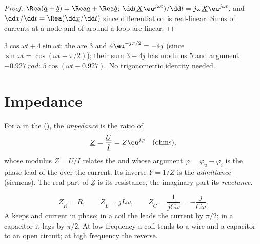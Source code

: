\begin{proof}
$\Rea(\underline a + \underline b) = \Rea\underline a + \Rea\underline b$;
$\dd(\underline X\eu^{j\omega t})/\dd t = j\omega\underline X\eu^{j\omega t}$,
and $\dd x/\dd t = \Rea(\dd\underline x/\dd t)$ since differentiation
is real-linear. Sums of currents at a node and of  around a
loop are linear.
\end{proof}

\begin{example}\label{ex:b1:sinusoidal-impedance:add}
$3\cos\omega t + 4\sin\omega t$: the  are $3$ and
$4\eu^{-j\pi/2} = -4j$ (since $\sin\omega t = \cos(\omega t - \pi/2)$);
their sum $3 - 4j$ has modulus $5$ and argument $-0.927\ \unit{rad}$:
$5\cos(\omega t - 0.927)$. No trigonometric identity needed.
\end{example}

\section{Impedance}

\begin{definition}\label{def:b1:sinusoidal-impedance:impedance}
For a  in the  (), the \emph{impedance} is the ratio of 
\[
\underline Z = \frac{\underline U}{\underline I} = Z\eu^{j\varphi}
\quad (\text{ohms}),
\]
whose modulus $Z = U/I$ relates the  and whose argument
$\varphi = \varphi_u - \varphi_i$ is the phase lead of the  over
the current. Its inverse $\underline Y = 1/\underline Z$ is the
\emph{admittance} (siemens). The real part of $\underline Z$ is its
resistance, the imaginary part its \emph{reactance}.
\end{definition}

\begin{proposition}[Impedances of R, L, C]\label{prop:b1:sinusoidal-impedance:rlc}
\[
\underline Z_R = R, \qquad \underline Z_L = jL\omega, \qquad
\underline Z_C = \frac{1}{jC\omega} = -\frac{j}{C\omega} .
\]
A  keeps  and current in phase; in a coil the 
leads the current by $\pi/2$; in a capacitor it lags by $\pi/2$. At low
frequency a coil tends to a wire and a capacitor to an open circuit; at
high frequency the reverse.
\end{proposition}

